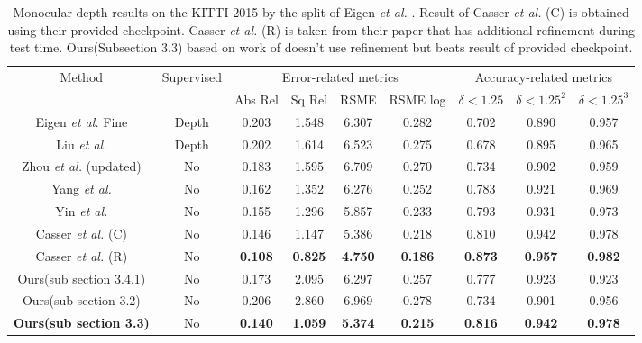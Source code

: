 \documentclass[10pt,twocolumn,letterpaper]{article}
\begin{document}
\begin{table}[htbp]
\centering
\begin{tabular}{ c||c| c c c c|c c c  }
 \hline
  \multirow{2}{*}{Method} & \multirow{2}{*}{Supervised} & \multicolumn{4}{c|}{Error-related metrics} & \multicolumn{3}{c}{Accuracy-related metrics}\\
  &   & Abs Rel & Sq Rel & RSME & RSME log & $\delta < 1.25$ & $\delta < 1.25^2$ & $\delta < 1.25^3$\\
 \hline
 
  Eigen \textit{et al.} \cite{eigen2014depth} Fine & Depth & 0.203 & 1.548 & 6.307 & 0.282 & 0.702 & 0.890 & 0.957 \\

  Liu \textit{et al.}  \cite{liu2016learning} & Depth & 0.202 & 1.614 & 6.523 & 0.275 & 0.678 & 0.895 & 0.965 \\

  Zhou \textit{et al.} \cite{zhou2017unsupervised}(updated) & No & 0.183 & 1.595 & 6.709 & 0.270 & 0.734 & 0.902 & 0.959\\
  
  Yang \textit{et al.} \cite{yang2018lego} & No & 0.162 & 1.352 & 6.276 & 0.252 & 0.783 & 0.921 & 0.969\\

  Yin \textit{et al.} \cite{yin2018geonet} & No & 0.155 & 1.296 & 5.857 & 0.233 & 0.793 & 0.931 & 0.973 \\
  
  Casser \textit{et al.} \cite{casser2018depth}(C) & No & 0.146 & 1.147 & 5.386 & 0.218 & 0.810 & 0.942 & 0.978 \\
 
  Casser \textit{et al.} \cite{casser2018depth}(R) & No & \textbf{0.108} & \textbf{0.825} & \textbf{4.750} & \textbf{0.186} & \textbf{0.873} & \textbf{0.957} & \textbf{0.982} \\

  \hline

  Ours(sub section 3.4.1) & No & 0.173 & 2.095
 & 6.297 & 0.257 & 0.777 & 0.923 & 0.923 \\
  Ours(sub section 3.2) & No &  0.206 & 2.860 & 6.969 & 0.278 & 0.734 & 0.901 &     0.956 \\
  
  \textbf{Ours(sub section 3.3)} & No & \textbf{0.140} &     \textbf{1.059} &     \textbf{5.374} &     \textbf{0.215} &     \textbf{0.816} &     \textbf{0.942} &     \textbf{0.978}\\
 \hline
\end{tabular}
\caption{Monocular depth results on the KITTI 2015 \cite{kitti} by the split of Eigen \textit{et al.} \cite{eigen2014depth}. Result of Casser \textit{et al.} (C) is obtained using their provided checkpoint. Casser \textit{et al.} (R) is taken from their paper that has additional refinement during test time. Ours(Subsection 3.3) based on work of \cite{casser2018depth} doesn't use refinement but beats result of provided checkpoint.} \label{tab:depth_pred}
\end{table}
\end{document}

